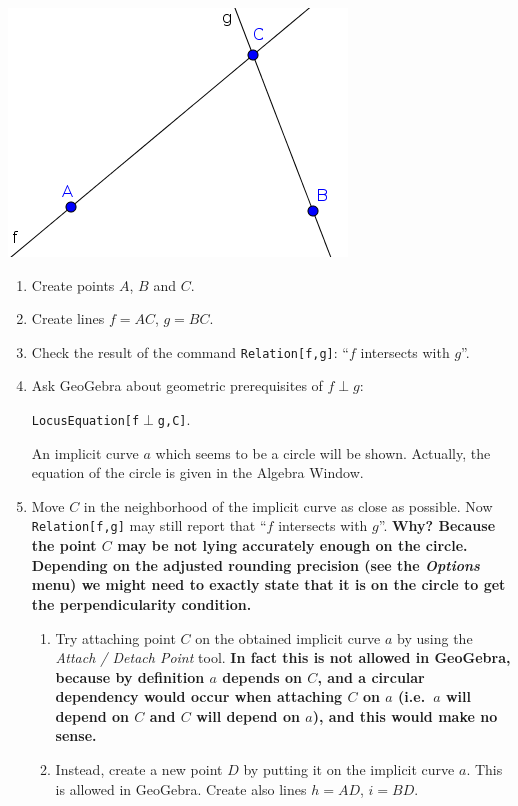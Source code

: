 \documentclass{article}
\begin{document}
\begin{center}
\includegraphics[scale=0.5]{limitations-Thales1-1}
\end{center}
\begin{enumerate}
    \item Create points $A$, $B$ and $C$.
    \item Create lines $f=AC$, $g=BC$.
    \item Check the result of the command \texttt{Relation[f,g]}: ``$f$ intersects with $g$''.
    \item Ask GeoGebra about geometric prerequisites of $f\perp g$:
\begin{center}\texttt{LocusEquation[f$\perp$g,C]}.\end{center}
An implicit curve $a$ which seems to be a circle will be shown. Actually, the equation of the circle
is given in the Algebra Window.
    \item Move $C$ in the neighborhood of the implicit curve as close as possible. Now \texttt{Relation[f,g]} may still report that ``$f$ intersects with $g$''. \textbf{Why? Because the point $C$ may be not lying accurately enough on the circle. Depending on the adjusted rounding precision (see the \textit{Options} menu) we might need to exactly state that it is on the circle to get the perpendicularity condition.}
    \begin{enumerate}
      \item Try attaching point $C$ on the obtained implicit curve $a$ by using the \textit{Attach / Detach Point} tool. \textbf{In fact this is not allowed in GeoGebra, because by definition $a$ depends on $C$, and a circular dependency  would occur when attaching $C$ on $a$ (i.e.~$a$ will depend on $C$ and $C$ will depend on $a$), and this would make no sense.}
      \item Instead, create a new point $D$ by putting it on the implicit curve $a$. This is allowed in GeoGebra. Create also lines $h=AD$, $i=BD$.

\end{enumerate}
\end{enumerate}
\end{document}
